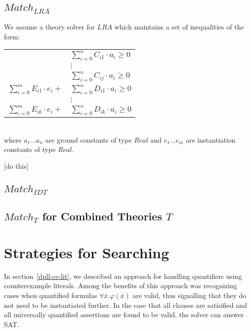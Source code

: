 \documentclass{llncs}
\begin{document}
\subsection{$Match_{LRA}$}

We assume a theory solver for $LRA$ which maintains a set of inequalities of the form:

\begin{tabular}{rl}
 & $\displaystyle\sum\limits_{i=0}^n C_{i1} \cdot a_i \geq 0$ \\
 & $\vdots$ \\
 & $\displaystyle\sum\limits_{i=0}^n C_{ij} \cdot a_i \geq 0$ \\
 $\displaystyle\sum\limits_{i=0}^m E_{i1} \cdot e_i +$ & $\displaystyle\sum\limits_{i=0}^n D_{i1} \cdot a_i \geq 0$ \\
 & $\vdots$ \\
 $\displaystyle\sum\limits_{i=0}^m E_{ik} \cdot e_i +$ & $\displaystyle\sum\limits_{i=0}^n D_{ik} \cdot a_i \geq 0$ \\
 \end{tabular} \\

where $a_1 \ldots a_n$ are ground constants of type $Real$ and $e_1 \ldots e_m$ are instantiation constants of type $Real$.

[do this]

\subsection{$Match_{IDT}$}

\subsection{$Match_{T}$ for Combined Theories $T$}

\section{Strategies for Searching}

In section~\ref{dpll-ce-lit}, we described an approach for handling quantifiers using counterexample literals.
Among the benefits of this approach was recognizing cases when quantified formulas $\forall \bar{x}. \varphi( \bar{x} )$ are valid, thus signalling that they do not need to be instantiated further.
In the case that all clauses are satisified and all universally quantified assertions are found to be valid, the solver can answer SAT.
\end{document}
